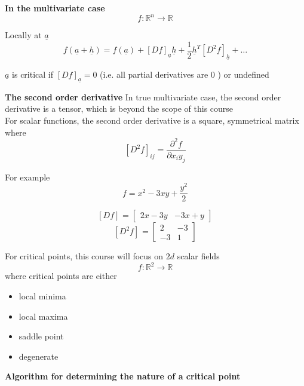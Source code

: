 \textbf{In the multivariate case}
\[
  f: \mathbb{R}^n \rightarrow \mathbb{R}
\] 

Locally at $ \underline{a}$
\[
   f( \underline{a} + \underline{h}) = f( \underline{a}) + \left[ D f \right]_{ \underline{a}} \underline{h} + \frac{1}{2} \underline{h}^T \left[ D^2 f \right]_{ \underline{h}}  + \hdots
\] 

\begin{framed}
   $ \underline{a}$ is critical if $\left[ D f \right]_{ \underline{a}} = 0$ (i.e. all partial derivatives are $0$ ) or undefined
\end{framed}

\textbf{The second order derivative}
In true multivariate case, the second order derivative is a tensor, which is beyond the scope of this course \\

For scalar functions, the second order derivative is a square, symmetrical matrix where
\[
\left[ D^2 f \right]_{ij}  = \frac{\partial^2 f}{\partial x_i y_j}
\] 

For example
\[
  f = x^2 -3xy + \frac{y^2}{2}
\] 

\[
  \left[ D f \right]_{} = \begin{bmatrix} 
     2x - 3y & -3x + y  
  \end{bmatrix}
\] 
\[
  \left[ D^2 f \right]_{} = \begin{bmatrix} 
     2 & -3 \\ -3 & 1  
  \end{bmatrix}
\] 

For critical points, this course will focus on $2d$ scalar fields
\[
  f: \mathbb{R}^2 \rightarrow \mathbb{R}
\] 
where critical points are either
\begin{itemize}
   \item local minima
   \item local maxima
   \item saddle point
   \item degenerate
\end{itemize}

\textbf{Algorithm for determining the nature of a critical point}

